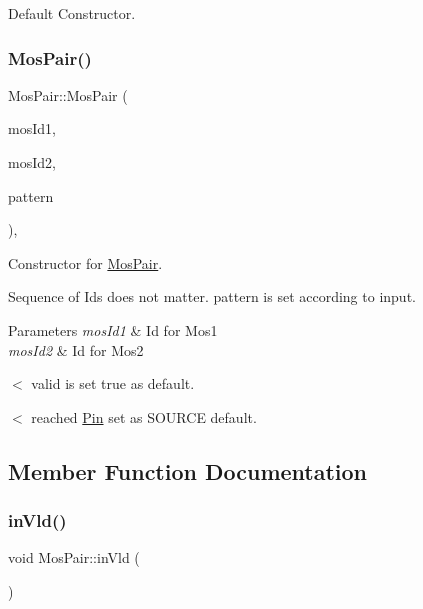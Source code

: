 Default Constructor. 

\mbox{\label{classMosPair_a03e4f764099652cbb0a79f7e0392c315}} 
\subsubsection{\texorpdfstring{Mos\+Pair()}{MosPair()}\hspace{0.1cm}{\footnotesize\ttfamily [2/2]}}
{\footnotesize\ttfamily Mos\+Pair\+::\+Mos\+Pair (\begin{DoxyParamCaption}\item[{\hyperlink{type_8h_a581e8093e28e7362f2b6937296190676}{Index\+Type}}]{mos\+Id1,  }\item[{\hyperlink{type_8h_a581e8093e28e7362f2b6937296190676}{Index\+Type}}]{mos\+Id2,  }\item[{\hyperlink{type_8h_af19eddb079bfea723256710b029c38e8}{Mos\+Pattern}}]{pattern }\end{DoxyParamCaption})\hspace{0.3cm}{\ttfamily [inline]}, {\ttfamily [explicit]}}



Constructor for \hyperlink{classMosPair}{Mos\+Pair}. 

Sequence of Ids does not matter. pattern is set according to input.


\begin{DoxyParams}{Parameters}
{\em mos\+Id1} & Id for Mos1 \\
\hline
{\em mos\+Id2} & Id for Mos2 \\
\hline
\end{DoxyParams}
$<$ valid is set true as default.

$<$ reached \hyperlink{classPin}{Pin} set as S\+O\+U\+R\+CE default. 

\subsection{Member Function Documentation}
\mbox{\label{classMosPair_a3064a984676f0bd8e6d380a050bd2152}} 
\subsubsection{\texorpdfstring{in\+Vld()}{inVld()}}
{\footnotesize\ttfamily void Mos\+Pair\+::in\+Vld (\begin{DoxyParamCaption}{ }\end{DoxyParamCaption})\hspace{0.3cm}{\ttfamily [inline]}}



